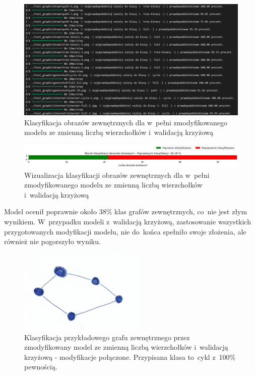 \begin{figure}[ht]
	\centering
	\includegraphics[width=15.5cm]{resources/tests/images/v4/multiple_edges_crossvalid_txt.png}
	\caption{Klasyfikacja obrazów zewnętrznych dla w~pełni zmodyfikowanego modelu ze zmienną liczbą wierzchołków i~walidacją krzyżową}
	\label{Fig:tests-csvar-2b}
\end{figure}
\FloatBarrier

\begin{figure}[ht]
	\centering
	\includegraphics[width=15.5cm]{resources/tests/images/v4/multiple_edges_crossvalid_bar.png}
	\caption{Wizualizacja klasyfikacji obrazów zewnętrznych dla w~pełni zmodyfikowanego modelu ze zmienną liczbą wierzchołków i~walidacją krzyżową}
	\label{Fig:tests-csvar-2c}
\end{figure}
\FloatBarrier

Model ocenił poprawnie około 38\% klas grafów zewnętrznych, co~nie jest złym wynikiem.
W~przypadku modeli z~walidacją krzyżową, zastosowanie wszystkich przygotowanych modyfikacji modelu,
nie do~końca spełniło swoje złożenia, ale również nie pogorszyło wyniku.

\begin{figure}[ht]
	\centering
	\includegraphics[height=4cm]{../graph_classification/test_graphs/drawn/cycle-2.png}
	\caption{Klasyfikacja przykładowego grafu zewnętrznego przez zmodyfikowany model
		ze zmienną liczbą wierzchołków i~walidacją krzyżową - modyfikacje połączone.
		Przypisana klasa to~cykl z~100\% pewnością.}
	\label{Fig:tests-cv-2d}
\end{figure}
\FloatBarrier